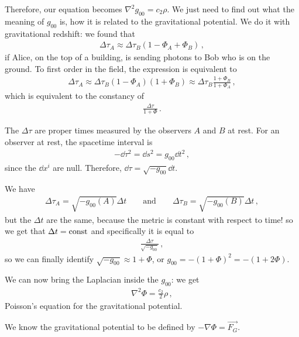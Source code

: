 \documentclass[main.tex]{subfiles}
\begin{document}
Therefore, our equation becomes \(\nabla^2 g_{00} = c_2 \rho \). We just need to find out what the meaning of \(g_{00}\) is, how it is related to the gravitational potential.
We do it with gravitational redshift: we found that 
%
\begin{align}
  \Delta \tau_{A} \approx \Delta \tau_{B} (1 - \Phi_{A} + \Phi_{B})
  \,,
\end{align}
%
if Alice, on the top of a building, is sending photons to Bob who is on the ground. To first order in the field, the expression is equivalent to 
%
\begin{align}
    \Delta \tau_{A} \approx \Delta \tau_{B} (1 - \Phi_{A}) (1+ \Phi_{B}) \approx \Delta \tau_{B} \frac{1 + \Phi_{B}}{1 + \Phi_{A}}
\,,
\end{align}
%
which is equivalent to the constancy of 
%
\begin{align}
  \frac{\Delta \tau}{1 + \Phi }
\,.
\end{align}

The \(\Delta \tau \) are proper times measured by the observers \(A\) and \(B\) at rest. 
For an observer at rest, the spacetime interval is 
%
\begin{align}
  -\dd{\tau }^2 = \dd{s}^2 = g_{00} \dd{t^2} 
\,,
\end{align}
%
since the \(\dd{x^{i}} \) are null. Therefore, \(\dd{\tau } = \sqrt{-g_{00}}  \dd{t} \).

We have 
%
\begin{align}
  \Delta \tau_{A} = \sqrt{-g_{00}(A)} \Delta t
    \qquad \text{and} \qquad
  \Delta \tau_{B} = \sqrt{-g_{00}(B)} \Delta t
\,,
\end{align}
%
but the \(\Delta t\) are the same, because the metric is constant with respect to time! so we get that \(\Delta t = \text{const}\) and specifically it is equal to 
%
\begin{align}
  \frac{\Delta \tau }{\sqrt{-g_{00}}}
\,,
\end{align}
%
so we can finally identify \(\sqrt{-g_{00}} \approx 1 + \Phi \), or \(g_{00} = - (1+\Phi )^2 = - (1+ 2 \Phi )\).

We can now bring the Laplacian inside the \(g_{00}\): we get 
%
\begin{align}
  \nabla^2 \Phi = \frac{c_2}{2} \rho  
\,,
\end{align}
%
Poisson's equation for the gravitational potential.

We know the gravitational potential to be defined by \(- \nabla \Phi = \vec{F_G}\).
\end{document}
